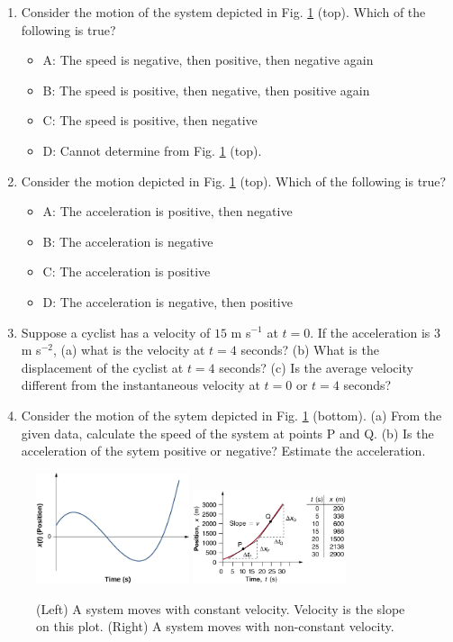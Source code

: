 \documentclass{article}
\begin{document}
\begin{enumerate}
\item Consider the motion of the system depicted in Fig. \ref{fig:1} (top).  Which of the following is true?
\begin{itemize}
\item A: The speed is negative, then positive, then negative again
\item B: The speed is positive, then negative, then positive again
\item C: The speed is positive, then negative
\item D: Cannot determine from Fig. \ref{fig:1} (top).
\end{itemize}
\item Consider the motion depicted in Fig. \ref{fig:1} (top).  Which of the following is true?
\begin{itemize}
\item A: The acceleration is positive, then negative
\item B: The acceleration is negative
\item C: The acceleration is positive
\item D: The acceleration is negative, then positive
\end{itemize}
\item Suppose a cyclist has a velocity of $15$ m s$^{-1}$ at $t=0$.  If the acceleration is 3 m s$^{-2}$, (a) what is the velocity at $t = 4$ seconds? (b) What is the displacement of the cyclist at $t = 4$ seconds? (c) Is the average velocity different from the instantaneous velocity at $t=0$ or $t=4$ seconds?  \\ \vspace{3cm}
\item Consider the motion of the sytem depicted in Fig. \ref{fig:1} (bottom).  (a) From the given data, calculate the speed of the system at points P and Q. (b) Is the acceleration of the sytem positive or negative?  Estimate the acceleration.
\end{enumerate}

\begin{figure}
\centering
\includegraphics[width=0.4\textwidth]{figures/x_vs_t.jpeg} \hspace{1cm}
\includegraphics[width=0.4\textwidth]{figures/slope2.jpeg}
\caption{\label{fig:1} (Left) A system moves with constant velocity.  Velocity is the slope on this plot. (Right) A system moves with non-constant velocity.}
\end{figure}
\end{document}
